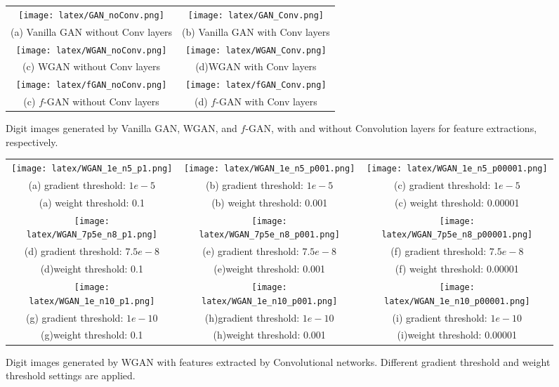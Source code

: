 \documentclass[10pt,twocolumn,letterpaper]{article}
\begin{document}
\begin{figure*}
\centering
\begin{tabular}{cc}
  \texttt{[image: latex/GAN\_noConv.png]} &   \texttt{[image: latex/GAN\_Conv.png]} \\
(a) Vanilla GAN without Conv layers & (b) Vanilla GAN with Conv layers \\[6pt]
 \texttt{[image: latex/WGAN\_noConv.png]} &   \texttt{[image: latex/WGAN\_Conv.png]} \\
(c) WGAN without Conv layers & (d)WGAN with Conv layers \\[6pt]
 \texttt{[image: latex/fGAN\_noConv.png]} &   \texttt{[image: latex/fGAN\_Conv.png]} \\
(c) $f$-GAN without Conv layers & (d) $f$-GAN with Conv layers \\[6pt]
\end{tabular}
\caption{Digit images generated by Vanilla GAN, WGAN, and $f$-GAN, with and without Convolution layers for feature extractions, respectively.}
\label{gans_conv}
\end{figure*}

\begin{figure*}
\centering
\begin{tabular}{ccc}
  \texttt{[image: latex/WGAN\_1e\_n5\_p1.png]} &   \texttt{[image: latex/WGAN\_1e\_n5\_p001.png]} &   \texttt{[image: latex/WGAN\_1e\_n5\_p00001.png]} \\
(a) gradient threshold: $1e-5$ & (b)  gradient threshold: $1e-5$ & (c)  gradient threshold: $1e-5$\\[6pt]
(a) weight threshold: 0.1 & (b) weight threshold: 0.001 & (c)  weight threshold: 0.00001\\[6pt]
\texttt{[image: latex/WGAN\_7p5e\_n8\_p1.png]} &   \texttt{[image: latex/WGAN\_7p5e\_n8\_p001.png]} &   \texttt{[image: latex/WGAN\_7p5e\_n8\_p00001.png]} \\
(d) gradient threshold: $7.5e-8$ & (e)  gradient threshold: $7.5e-8$& (f)  gradient threshold: $7.5e-8$\\[6pt]
(d)weight threshold: 0.1 & (e)weight threshold: 0.001 & (f)  weight threshold: 0.00001\\[6pt]
\texttt{[image: latex/WGAN\_1e\_n10\_p1.png]} &   \texttt{[image: latex/WGAN\_1e\_n10\_p001.png]} &   \texttt{[image: latex/WGAN\_1e\_n10\_p00001.png]} \\
(g) gradient threshold: $1e-10$ & (h)gradient threshold: $1e-10$& (i)  gradient threshold: $1e-10$\\[6pt]
(g)weight threshold: 0.1 & (h)weight threshold: 0.001 & (i)weight threshold: 0.00001\\[6pt]
\end{tabular}
\caption{Digit images generated by WGAN with features extracted by Convolutional networks. Different gradient threshold and weight threshold settings are applied.}
\label{gans_conv_hyper_p}
\end{figure*}
\end{document}
